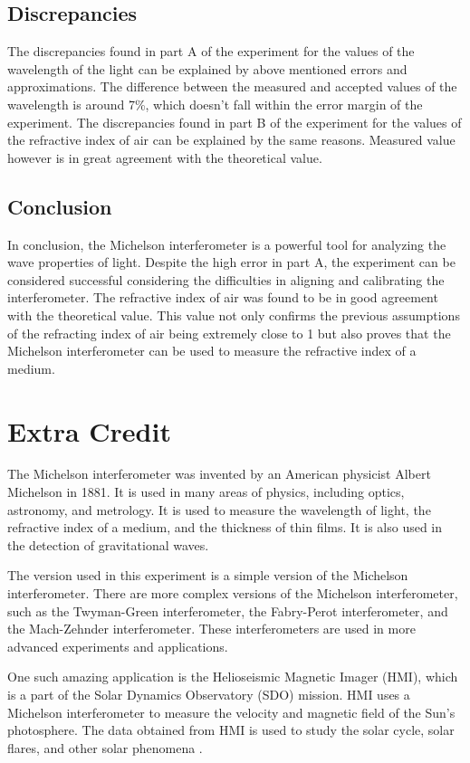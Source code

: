 \documentclass[10pt]{article}
\begin{document}
\subsection*{Discrepancies}

The discrepancies found in part A of the experiment for the values of the wavelength of the light can be explained by above mentioned errors and approximations. The difference between the measured and accepted values of the wavelength is around 7\%, which doesn't fall within the error margin of the experiment. The discrepancies found in part B of the experiment for the values of the refractive index of air can be explained by the same reasons. Measured value however is in great agreement with the theoretical value. 
\subsection*{Conclusion}

In conclusion, the Michelson interferometer is a powerful tool for analyzing the wave properties of light. Despite the high error in part A, the experiment can be considered successful considering the difficulties in aligning and calibrating the interferometer. The refractive index of air was found to be in good agreement with the theoretical value. This value not only confirms the previous assumptions of the refracting index of air being extremely close to 1 but also proves that the Michelson interferometer can be used to measure the refractive index of a medium.   

\section{Extra Credit}

The Michelson interferometer was invented by an American physicist Albert Michelson in 1881. It is used in many areas of physics, including optics, astronomy, and metrology. It is used to measure the wavelength of light, the refractive index of a medium, and the thickness of thin films. It is also used in the detection of gravitational waves. 

The version used in this experiment is a simple version of the Michelson interferometer. There are more complex versions of the Michelson interferometer, such as the Twyman-Green interferometer, the Fabry-Perot interferometer, and the Mach-Zehnder interferometer. These interferometers are used in more advanced experiments and applications.

One such amazing application is the Helioseismic Magnetic Imager (HMI), which is a part of the Solar Dynamics Observatory (SDO) mission. HMI uses a Michelson interferometer to measure the velocity and magnetic field of the Sun's photosphere. The data obtained from HMI is used to study the solar cycle, solar flares, and other solar phenomena \cite{Scherrer_2011}.

\printbibliography
\end{document}
